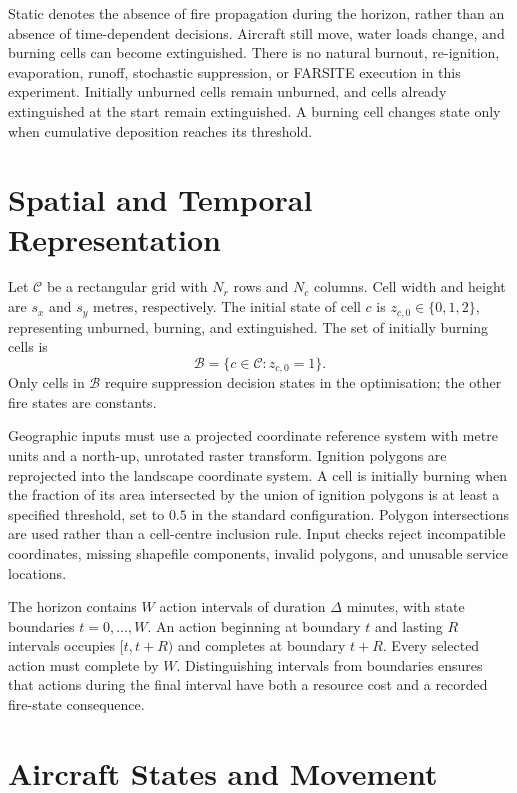 Static denotes the absence of fire propagation during the horizon, rather than an absence of time-dependent decisions. Aircraft still move, water loads change, and burning cells can become extinguished. There is no natural burnout, re-ignition, evaporation, runoff, stochastic suppression, or FARSITE execution in this experiment. Initially unburned cells remain unburned, and cells already extinguished at the start remain extinguished. A burning cell changes state only when cumulative deposition reaches its threshold.

\section{Spatial and Temporal Representation}
\label{sec:method-grid}

Let $\mathcal{C}$ be a rectangular grid with $N_r$ rows and $N_c$ columns. Cell width and height are $s_x$ and $s_y$ metres, respectively. The initial state of cell $c$ is $z_{c,0}\in\{0,1,2\}$, representing unburned, burning, and extinguished. The set of initially burning cells is
\begin{equation}
    \mathcal{B}=\{c\in\mathcal{C}:z_{c,0}=1\}.
\end{equation}
Only cells in $\mathcal{B}$ require suppression decision states in the optimisation; the other fire states are constants.

Geographic inputs must use a projected coordinate reference system with metre units and a north-up, unrotated raster transform. Ignition polygons are reprojected into the landscape coordinate system. A cell is initially burning when the fraction of its area intersected by the union of ignition polygons is at least a specified threshold, set to $0.5$ in the standard configuration. Polygon intersections are used rather than a cell-centre inclusion rule. Input checks reject incompatible coordinates, missing shapefile components, invalid polygons, and unusable service locations.

The horizon contains $W$ action intervals of duration $\Delta$ minutes, with state boundaries $t=0,\ldots,W$. An action beginning at boundary $t$ and lasting $R$ intervals occupies $[t,t+R)$ and completes at boundary $t+R$. Every selected action must complete by $W$. Distinguishing intervals from boundaries ensures that actions during the final interval have both a resource cost and a recorded fire-state consequence.

\section{Aircraft States and Movement}
\label{sec:method-aircraft}

